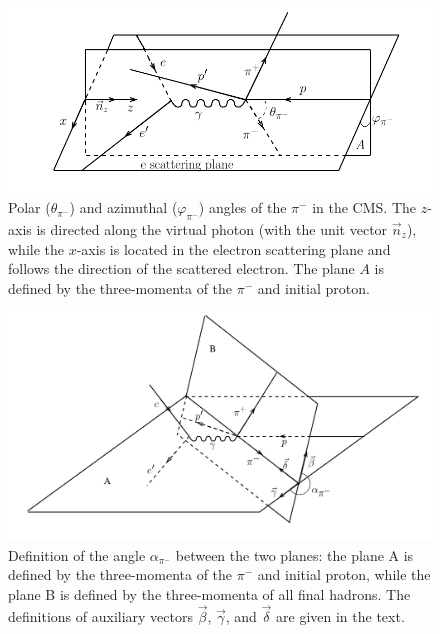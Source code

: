 \begin{figure}[htp]
\begin{center}
\includegraphics[width=14cm]{pictures/cross_section/thetaphi_new.pdf}
\caption{\small Polar ($\theta_{\pi^{-}}$) and azimuthal ($\varphi_{\pi^{-}}$) angles of the $\pi^{-}$ in the CMS. The $z$-axis is directed along the virtual photon (with the unit vector $\vec n_{z}$), while the $x$-axis is located in the electron scattering plane and follows the direction of the scattered electron. The plane $A$ is defined by the three-momenta of the $\pi^{-}$ and initial proton. } \label{fig:cr_sec_thetaphi}
\end{center}
\end{figure}
\begin{figure}[htp]
\begin{center}
\includegraphics[width=14cm]{pictures/cross_section/alpha1.pdf}
\caption{\small Definition of the angle $\alpha_{\pi^{-}}$ between the two planes: the plane A is defined by  the three-momenta of the $\pi^{-}$ and initial proton, while the plane B is defined by the three-momenta of all final hadrons. The definitions of  auxiliary vectors $\vec \beta$, $\vec \gamma$, and $\vec \delta$ are given in the text.} \label{fig:cr_sec_kinematic2}
\end{center}
\end{figure}



